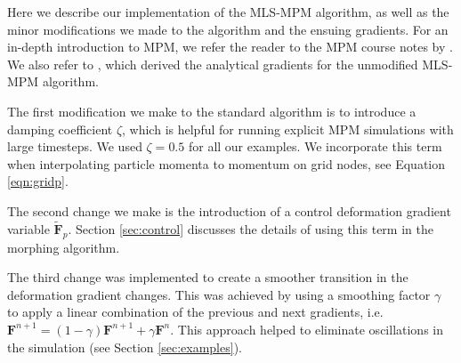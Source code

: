 \renewcommand{\theequation}{A\arabic{equation}} 
\setcounter{equation}{0}  %

Here we describe our implementation of the {MLS-MPM} algorithm, as well as the minor modifications we made to the algorithm and the ensuing gradients. %
For an in-depth introduction to {MPM}, we refer the reader to the {MPM} course notes by \citet{jiang2016material}.
We also refer to \citet{2018-ChainQueen}, which derived the analytical gradients for the unmodified {MLS-MPM} algorithm.

The first modification we make to the standard algorithm is to introduce a damping coefficient $\zeta$, which is helpful for running explicit {MPM} simulations with large timesteps.
We used $\zeta = 0.5$ for all our examples.
We incorporate this term when interpolating particle momenta to momentum on grid nodes, see Equation \ref{eqn:gridp}.

The second change we make is the introduction of a control deformation gradient variable $\mathbf{\tilde{F}}_{p}$.
Section \ref{sec:control} discusses the details of using this term in the morphing algorithm.

\newcommand{\PK}[2]{\mathbf{P}_{#1} ^{#2} }

\newcommand{\F}[2]{\mathbf{F}_{#1} ^{#2} }


The third change was implemented to create a smoother transition in the deformation gradient changes. This was achieved by using a smoothing factor $\gamma$ to apply a linear combination of the previous and next gradients, i.e. $\textbf{F}^{n+1} = (1 - \gamma)\textbf{F}^{n+1} + \gamma\textbf{F}^{n}$. This approach helped to eliminate oscillations in the simulation (see Section \ref{sec:examples}).

